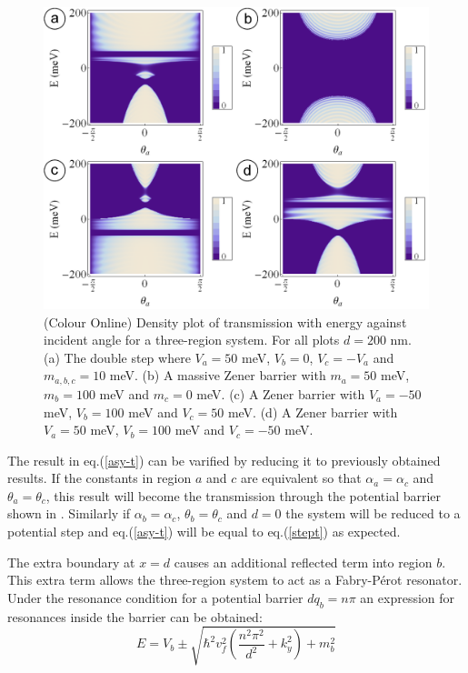 \documentclass[prl,twocolumn,aps,superscriptaddress,floatfix,10pt]{revtex4}
\begin{document}
\begin{figure}
	\includegraphics[scale=0.2]{asy-t-flat}
	\caption{(Colour Online) Density plot of transmission with energy against incident angle for a three-region system. For all plots $d=200$ nm. (a) The double step where $V_{a}=50$ meV, $V_{b}=0$, $V_{c}=-V_{a}$ and $m_{a,b,c}=10$ meV. (b) A massive Zener barrier with $m_{a}=50$ meV, $m_{b}=100$ meV and $m_{c}=0$ meV. (c) A Zener barrier with $V_{a}=-50$ meV, $V_{b}=100$ meV and $V_{c}=50$ meV. (d) A Zener barrier with $V_{a}=50$ meV, $V_{b}=100$ meV and $V_{c}=-50$ meV.}
	\label{asy-t-flat}
\end{figure}

	The result in eq.(\ref{asy-t}) can be varified by reducing it to previously obtained results. If the constants in region $a$ and $c$ are equivalent so that $\alpha_{a}=\alpha_{c}$ and $\theta_{a}=\theta_{c}$, this result will become the transmission through the potential barrier shown in \cite{b1}. Similarly if $\alpha_{b}=\alpha_{c}$, $\theta_{b}=\theta_{c}$ and $d=0$ the system will be reduced to a potential step and eq.(\ref{asy-t}) will be equal to eq.(\ref{stept}) as expected.

	The extra boundary at $x=d$ causes an additional reflected term into region $b$. This extra term allows the three-region system to act as a Fabry-P\'{e}rot resonator. Under the resonance condition for a potential barrier $dq_{b}=n\pi$ \cite{b6} an expression for resonances inside the barrier can be obtained:
\begin{equation}
	E=V_{b}\pm\sqrt{\hbar^{2}v_{f}^{2}\left(\frac{n^{2}\pi^{2}}{d^{2}}+k_{y}^{2}\right)+m_{b}^{2}}
	\label{resonances}
\end{equation}
\end{document}

